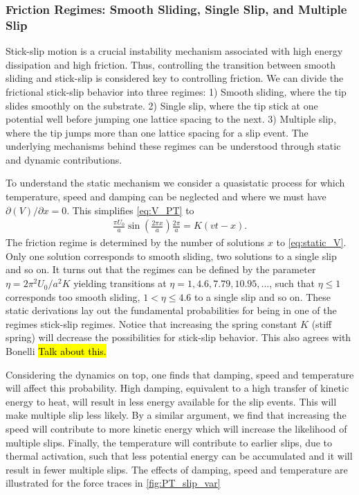 \subsubsection{Friction Regimes: Smooth Sliding, Single Slip, and Multiple Slip}
Stick-slip motion is a crucial instability mechanism associated with high energy dissipation and high friction. Thus, controlling the transition between smooth sliding and stick-slip is considered key to controlling friction. We can divide the frictional stick-slip behavior into three regimes: 1) Smooth sliding, where the tip slides smoothly on the substrate. 2) Single slip, where the tip stick at one potential well before jumping one lattice spacing to the next. 3) Multiple slip, where the tip jumps more than one lattice spacing for a slip event. The underlying mechanisms behind these regimes can be understood through static and dynamic contributions. 

To understand the static mechanism we consider a quasistatic process for which temperature, speed and damping can be neglected and where we must have $\partial(V)/\partial x = 0$. This simplifies \cref{eq:V_PT} to 
\begin{align}
  \frac{\pi U_0}{a} \sin\left(\frac{2\pi x}{a}\right) \frac{2 \pi}{a} = K(vt - x).
  \label{eq:static_V}
\end{align}
The friction regime is determined by the number of solutions $x$ to \cref{eq:static_V}. Only one solution corresponds to
smooth sliding, two solutions to a single slip and so on. It turns out that the
regimes can be defined by the parameter $\eta = 2\pi^2U_0/a^2K$ \cite{Johnson_1998, Medyanik_2006} yielding transitions at $\eta = 1, 4.6, 7.79, 10.95, \hdots$, such that $\eta \le 1$
corresponds too smooth sliding, $1<\eta \le 4.6$ to a single slip and so on. These static derivations lay out the fundamental probabilities for being in one of the regimes stick-slip regimes. Notice that increasing the spring constant $K$ (stiff spring) will decrease the possibilities for stick-slip behavior. This also agrees with Bonelli \hl{Talk about this.}

Considering the dynamics on top, one finds that damping, speed and temperature will affect this probability. High damping, equivalent to a high transfer
of kinetic energy to heat, will result in less energy available for the slip events. This will make multiple slip less likely. By a similar argument, we find that increasing the speed will contribute to more kinetic energy which will increase the likelihood of multiple slips. Finally, the temperature will contribute to earlier slips, due to thermal activation, such that
less potential energy can be accumulated and it will result in fewer multiple slips. The effects of damping, speed and temperature are illustrated for the force traces in \cref{fig:PT_slip_var}

